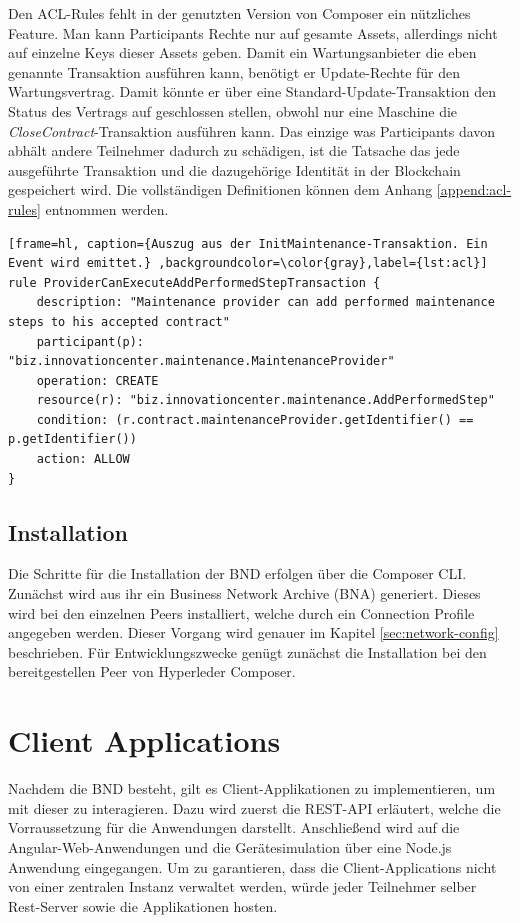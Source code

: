 Den ACL-Rules fehlt in der genutzten Version von Composer ein nützliches Feature. Man kann Participants Rechte nur auf gesamte Assets, allerdings nicht auf einzelne Keys dieser Assets geben. Damit ein Wartungsanbieter die eben genannte Transaktion ausführen kann, benötigt er Update-Rechte für den Wartungsvertrag. Damit könnte er über eine Standard-Update-Transaktion den Status des Vertrags auf geschlossen stellen, obwohl nur eine Maschine die \textit{CloseContract}-Transaktion ausführen kann. Das einzige was Participants davon abhält andere Teilnehmer dadurch zu schädigen, ist die Tatsache das jede ausgeführte Transaktion und die dazugehörige Identität in der Blockchain gespeichert wird. Die vollständigen Definitionen können dem Anhang \ref{append:acl-rules} entnommen werden.

\begin{lstfloat}
\begin{lstlisting}[frame=hl, caption={Auszug aus der InitMaintenance-Transaktion. Ein Event wird emittet.} ,backgroundcolor=\color{gray},label={lst:acl}]
rule ProviderCanExecuteAddPerformedStepTransaction {
    description: "Maintenance provider can add performed maintenance steps to his accepted contract"
    participant(p): "biz.innovationcenter.maintenance.MaintenanceProvider"
    operation: CREATE
    resource(r): "biz.innovationcenter.maintenance.AddPerformedStep"
    condition: (r.contract.maintenanceProvider.getIdentifier() == p.getIdentifier())
    action: ALLOW
}
\end{lstlisting} 
\end{lstfloat}

\subsection{Installation}
Die Schritte für die Installation der BND erfolgen über die Composer CLI. Zunächst wird aus ihr ein Business Network Archive (BNA) generiert. Dieses wird bei den einzelnen Peers installiert, welche durch ein Connection Profile angegeben werden. Dieser Vorgang wird genauer im Kapitel \ref{sec:network-config} beschrieben. Für Entwicklungszwecke genügt zunächst die Installation bei den bereitgestellen Peer von Hyperleder Composer.

\section{Client Applications}
Nachdem die BND besteht, gilt es Client-Applikationen zu implementieren, um mit dieser zu interagieren. Dazu wird zuerst die REST-API erläutert, welche die Vorraussetzung für die Anwendungen darstellt. Anschließend wird auf die Angular-Web-Anwendungen und die Gerätesimulation über eine Node.js Anwendung eingegangen. Um zu garantieren, dass die Client-Applications nicht von einer zentralen Instanz verwaltet werden, würde jeder Teilnehmer selber Rest-Server sowie die Applikationen hosten.

